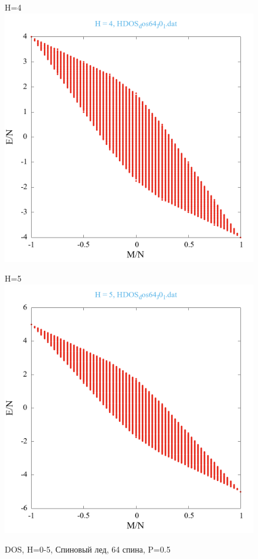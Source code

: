 \documentclass[utf8, babel, sor, jor, amsmath, amssymb, reprint]{elsarticle} %
\begin{document}
\begin{figure}[H]
\begin{minipage}[h]{0.45\linewidth}
	\end{minipage}
	\vfill
	\begin{minipage}[h]{0.45\linewidth}
		\centering H=4
		\includegraphics[width=1\linewidth]{HDOS_dos64_J0_1.dat_H4.png}
	\end{minipage}
	\hfill
	\begin{minipage}[h]{0.45\linewidth}
		\centering H=5
		\includegraphics[width=1\linewidth]{HDOS_dos64_J0_1.dat_H5.png}
	\end{minipage}
	\caption{DOS, H=0-5, Спиновый лед, 64 спина, P=0.5}
	\label{fig:HDOS_dos64_J0_1.dat}
\end{figure}
\end{document}
